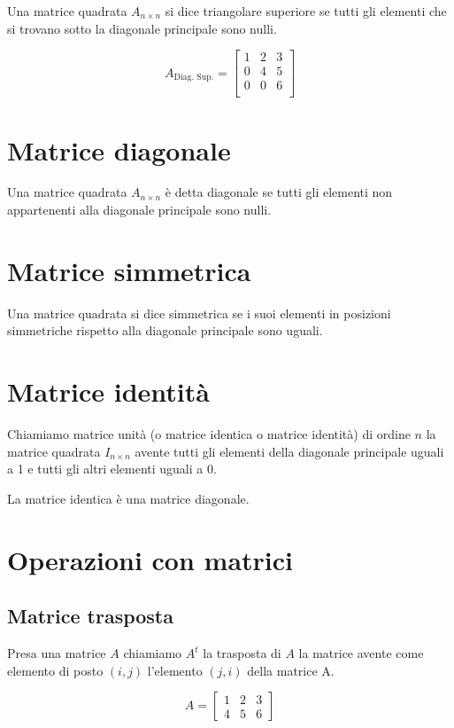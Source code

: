 Una matrice quadrata $A_{n\times n}$ si dice triangolare superiore se tutti gli elementi che si trovano sotto la diagonale principale sono nulli.

\[
A_{\text{Diag. Sup.}} =
\begin{bmatrix}
    1 & 2 & 3 \\
    0 & 4 & 5 \\
    0 & 0 & 6 \\
\end{bmatrix}
\]

\section{Matrice diagonale}

Una matrice quadrata $A_{n \times n}$ è detta diagonale se tutti gli elementi non appartenenti alla diagonale principale sono nulli.

\section{Matrice simmetrica}

Una matrice quadrata si dice simmetrica se i suoi elementi in posizioni simmetriche rispetto alla diagonale principale sono uguali.

\section{Matrice identità}

Chiamiamo matrice unità (o matrice identica o matrice identità) di ordine $n$ la matrice quadrata $I_{n \times n}$ avente tutti gli elementi della diagonale principale uguali a 1 e tutti gli altri elementi uguali a 0.

La matrice identica è una matrice diagonale.

\section{Operazioni con matrici}

\subsection{Matrice trasposta}

Presa una matrice $A$ chiamiamo $A^t$ la trasposta di $A$ la
matrice avente come elemento di posto $(i, j)$ l'elemento $(j, i)$
della matrice A.

$$
A =
\begin{bmatrix}
    1 & 2 & 3\\
    4 & 5 & 6
\end{bmatrix}
$$

